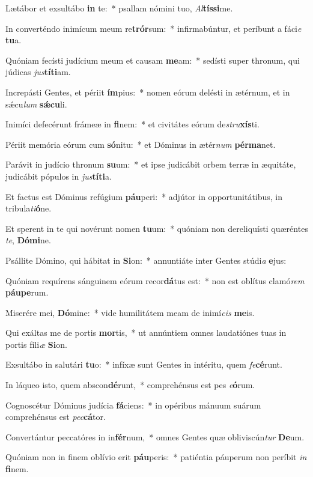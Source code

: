 \item Lætábor et exsultábo \textbf{in} te:~* psallam nómini tuo, \textit{Al}\textbf{tís}\textbf{si}me.
\item In converténdo inimícum meum re\textbf{trór}sum:~* infirmabúntur, et períbunt a fáci\textit{e} \textbf{tu}a.
\item Quóniam fecísti judícium meum et causam \textbf{me}am:~* sedísti super thronum, qui júdicas \textit{jus}\textbf{tí}\textbf{ti}am.
\item Increpásti Gentes, et périit \textbf{ím}pius:~* nomen eórum delésti in ætérnum, et in sǽcu\textit{lum} \textbf{sǽ}\textbf{cu}li.
\item Inimíci defecérunt frámeæ in \textbf{fi}nem:~* et civitátes eórum de\textit{stru}\textbf{xís}ti.
\item Périit memória eórum cum \textbf{só}nitu:~* et Dóminus in ætér\textit{num} \textbf{pér}\textbf{ma}net.
\item Parávit in judício thronum \textbf{su}um:~* et ipse judicábit orbem terræ in æquitáte, judicábit pópulos in \textit{jus}\textbf{tí}\textbf{ti}a.
\item Et factus est Dóminus refúgium \textbf{páu}peri:~* adjútor in opportunitátibus, in tribula\textit{ti}\textbf{ó}ne.
\item Et sperent in te qui novérunt nomen \textbf{tu}um:~* quóniam non dereliquísti quæréntes \textit{te}, \textbf{Dó}\textbf{mi}ne.
\item Psállite Dómino, qui hábitat in \textbf{Si}on:~* annuntiáte inter Gentes stúdi\textit{a} \textbf{e}jus:
\item Quóniam requírens sánguinem eórum recor\textbf{dá}tus est:~* non est oblítus clamó\textit{rem} \textbf{páu}\textbf{pe}rum.
\item Miserére mei, \textbf{Dó}mine:~* vide humilitátem meam de inimí\textit{cis} \textbf{me}is.
\item Qui exáltas me de portis \textbf{mor}tis,~* ut annúntiem omnes laudatiónes tuas in portis fíli\textit{æ} \textbf{Si}on.
\item Exsultábo in salutári \textbf{tu}o:~* infíxæ sunt Gentes in intéritu, quem \textit{fe}\textbf{cé}runt.
\item In láqueo isto, quem abscon\textbf{dé}runt,~* comprehénsus est pes \textit{e}\textbf{ó}rum.
\item Cognoscétur Dóminus judícia \textbf{fá}ciens:~* in opéribus mánuum suárum comprehénsus est \textit{pec}\textbf{cá}tor.
\item Convertántur peccatóres in in\textbf{fér}num,~* omnes Gentes quæ obliviscún\textit{tur} \textbf{De}um.
\item Quóniam non in finem oblívio erit \textbf{páu}peris:~* patiéntia páuperum non períbit \textit{in} \textbf{fi}nem.
